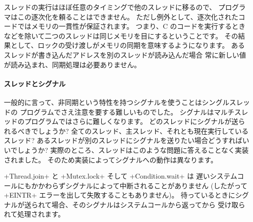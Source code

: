 スレッドの実行はほぼ任意のタイミングで他のスレッドに移るので、
プログラマはこの逐次化を頼ることはできません。
ただし例外として、逐次化されたコードではメモリの一貫性が保証されます。
つまり、C のコードを実行するときなどを除いて二つのスレッドは同じメモリを目にするということです。
その結果として、ロックの受け渡しがメモリの同期を意味するようになります。
あるスレッドが書き込んだアドレスを別のスレッドが読み込んだ場合
常に新しい値が読み込まれ、同期処理は必要ありません。

\paragraph {スレッドとシグナル}

一般的に言って、非同期という特性を持つシグナルを使うことはシングルスレッドの
プログラムでさえ注意を要する難しいものでした。
シグナルはマルチスレッドのプログラムではさらに難しくなります。
どのスレッドにシグナルが送られるべきでしょうか?
全てのスレッド、主スレッド、それとも現在実行しているスレッド?
あるスレッドが別のスレッドにシグナルを送りたい場合どうすればいいでしょうか?
実際のところ、スレッドはこのような問題に答えることなく実装されました。
そのため実装によってシグナルへの動作は異なります。

\ml+Thread.join+ と \ml+Mutex.lock+ そして \ml+Condition.wait+ は
遅いシステムコールにもかかわらずシグナルによって中断されることがありません
(したがって \ml+EINTR+ エラーを出して失敗することもありません)。
待っているときにシグナルが送られて場合、そのシグナルはシステムコールから返ってから
受け取られて処理されます。

